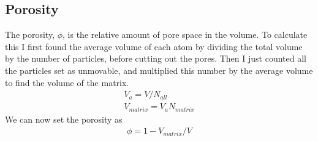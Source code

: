 \subsection{Porosity}
The porosity, $\phi$, is the relative amount of pore space in the volume. To calculate this I first found the average volume of each atom by dividing the total volume by the number of 
particles, before cutting out the pores. Then I just counted all the particles set as unmovable, and multiplied this number by the average volume to find the volume of the matrix.
\begin{align}
 V_a = V/N_{all}\nonumber\\
 V_{matrix} = V_a N_{matrix}\nonumber
\end{align}
We can now set the porosity as
\begin{align}
 \phi = 1-V_{matrix}/V
\end{align}


 
